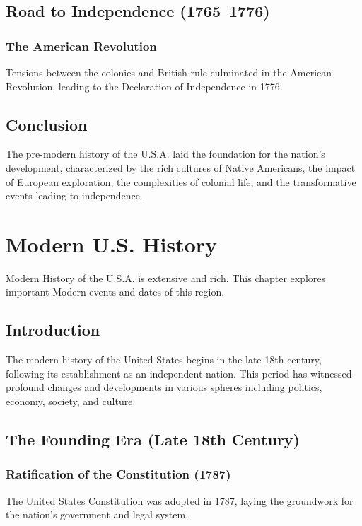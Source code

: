 \documentclass[a4paper,12pt]{book}
\begin{document}
\section{Road to Independence (1765–1776)}
\label{sec:road-independence}
\subsection{The American Revolution}
\label{subsec:american-revolution}
Tensions between the colonies and British rule culminated in the American Revolution, leading to the Declaration of Independence in 1776.

\section{Conclusion}
\label{sec:conclusion-pre-modern-usa}
The pre-modern history of the U.S.A. laid the foundation for the nation’s development, characterized by the rich cultures of Native Americans, the impact of European exploration, the complexities of colonial life, and the transformative events leading to independence.

\chapter{Modern U.S. History}
\label{ch:modern-us-history}

Modern History of the U.S.A. is extensive and rich. This chapter explores important Modern events and dates of this region.

\section{Introduction}
\label{sec:introduction-modern-usa}
The modern history of the United States begins in the late 18th century, following its establishment as an independent nation. This period has witnessed profound changes and developments in various spheres including politics, economy, society, and culture.

\section{The Founding Era (Late 18th Century)}
\label{sec:founding-era}
\subsection{Ratification of the Constitution (1787)}
\label{subsec:ratification-constitution}
The United States Constitution was adopted in 1787, laying the groundwork for the nation’s government and legal system.
\end{document}

